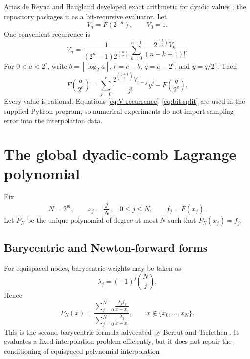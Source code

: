 \documentclass[11pt,oneside]{article}
\theoremstyle{definition}
\theoremstyle{remark}
\newcommand{\floor}[1]{\left\lfloor #1\right\rfloor}
\begin{document}
Arias de Reyna and Haugland developed exact arithmetic for dyadic values \cite{arias2018,haugland2016}; the repository packages it as a bit-recursive evaluator.  Let
\begin{equation}
 V_n=F(2^{-n}),\qquad V_0=1.
\end{equation}
One convenient recurrence is
\begin{equation}
 V_n=\frac{1}{(2^n-1)2^{\binom n2}}
 \sum_{k=0}^{n-1}\frac{2^{\binom k2}V_k}{(n-k+1)!}.
 \label{eq:V-recurrence}
\end{equation}
For $0<a<2^e$, write $b=\floor{\log_2a}$, $r=e-b$, $q=a-2^b$, and $y=q/2^e$.  Then
\begin{equation}
 F\!\left(\frac{a}{2^e}\right)
 =\sum_{j=0}^{r}\frac{2^{\binom{j+1}{2}}V_{r-j}}{j!}y^j
 -F\!\left(\frac{q}{2^e}\right).
 \label{eq:bit-split}
\end{equation}
Every value is rational.  Equations \eqref{eq:V-recurrence}--\eqref{eq:bit-split} are used in the supplied Python program, so numerical experiments do not import sampling error into the interpolation data.

\section{The global dyadic-comb Lagrange polynomial}
\label{sec:lagrange}

Fix
\begin{equation}
 N=2^m,
 \qquad x_j=\frac{j}{N},\quad 0\le j\le N,
 \qquad f_j=F(x_j).
 \label{eq:comb}
\end{equation}
Let $P_N$ be the unique polynomial of degree at most $N$ such that $P_N(x_j)=f_j$.

\subsection{Barycentric and Newton-forward forms}

For equispaced nodes, barycentric weights may be taken as
\begin{equation}
 \lambda_j=(-1)^j\binom Nj.
 \label{eq:full-bary-weights}
\end{equation}
Hence
\begin{equation}
 P_N(x)=
 \frac{\displaystyle\sum_{j=0}^{N}\frac{\lambda_j f_j}{x-x_j}}
 {\displaystyle\sum_{j=0}^{N}\frac{\lambda_j}{x-x_j}},
 \qquad x\notin\{x_0,\dots,x_N\}.
 \label{eq:bary-full}
\end{equation}
This is the second barycentric formula advocated by Berrut and Trefethen \cite{berrut-trefethen}.  It evaluates a fixed interpolation problem efficiently, but it does not repair the conditioning of equispaced polynomial interpolation.
\end{document}
